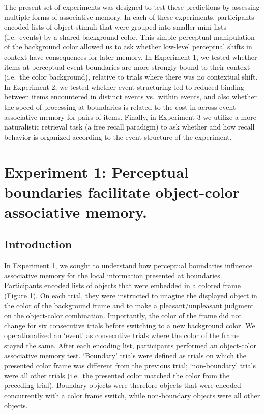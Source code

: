 The present set of experiments was designed to test these predictions by
assessing multiple forms of associative memory. In each of these
experiments, participants encoded lists of object stimuli that were
grouped into smaller mini-lists (i.e.~events) by a shared background
color. This simple perceptual manipulation of the background color
allowed us to ask whether low-level perceptual shifts in context have
consequences for later memory. In Experiment 1, we tested whether items
at perceptual event boundaries are more strongly bound to their context
(i.e.~the color background), relative to trials where there was no
contextual shift. In Experiment 2, we tested whether event structuring
led to reduced binding between items encountered in distinct events
vs.~within events, and also whether the speed of processing at
boundaries is related to the cost in across-event associative memory for
pairs of items. Finally, in Experiment 3 we utilize a more naturalistic
retrieval task (a free recall paradigm) to ask whether and how recall
behavior is organized according to the event structure of the
experiment.

\section{Experiment 1: Perceptual boundaries facilitate object-color
associative
memory.}\label{experiment-1-perceptual-boundaries-facilitate-object-color-associative-memory.}

\subsection{Introduction}\label{introduction}

In Experiment 1, we sought to understand how perceptual boundaries
influence associative memory for the local information presented at
boundaries. Participants encoded lists of objects that were embedded in
a colored frame (Figure 1). On each trial, they were instructed to
imagine the displayed object in the color of the background frame and to
make a pleasant/unpleasant judgment on the object-color combination.
Importantly, the color of the frame did not change for six consecutive
trials before switching to a new background color. We operationalized an
`event' as consecutive trials where the color of the frame stayed the
same. After each encoding list, participants performed an object-color
associative memory test. `Boundary' trials were defined as trials on
which the presented color frame was different from the previous trial;
`non-boundary' trials were all other trials (i.e.~the presented color
matched the color from the preceding trial). Boundary objects were
therefore objects that were encoded concurrently with a color frame
switch, while non-boundary objects were all other objects.

